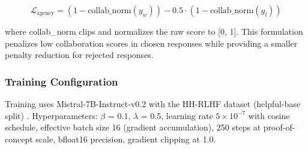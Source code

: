 $$\mathcal{L}_{\text{agency}} = (1 - \text{collab\_norm}(y_w)) - 0.5 \cdot (1 - \text{collab\_norm}(y_l))$$

where collab\_norm clips and normalizes the raw score to [0, 1]. This formulation penalizes low collaboration scores in chosen responses while providing a smaller penalty reduction for rejected responses.

\subsubsection{Training Configuration}

Training uses Mistral-7B-Instruct-v0.2 with the HH-RLHF dataset (helpful-base split) \citep{bai2022training}. Hyperparameters: $\beta$ = 0.1, $\lambda$ = 0.5, learning rate $5\times 10^{-7}$ with cosine schedule, effective batch size 16 (gradient accumulation), 250 steps at proof-of-concept scale, bfloat16 precision, gradient clipping at 1.0.


